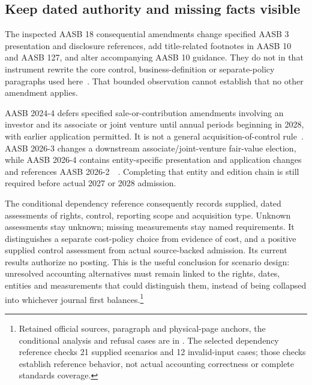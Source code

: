 \subsection{Keep dated authority and missing facts visible}

The inspected AASB 18 consequential amendments change specified AASB 3 presentation and disclosure references, add title-related footnotes in AASB 10 and AASB 127, and alter accompanying AASB 10 guidance. They do not in that instrument rewrite the core control, business-definition or separate-policy paragraphs used here~\citep[Appendix D, pp.~57, 70, 101--102]{aasb18scope2024}. That bounded observation cannot establish that no other amendment applies.

AASB 2024-4 defers specified sale-or-contribution amendments involving an investor and its associate or joint venture until annual periods beginning in 2028, with earlier application permitted. It is not a general acquisition-of-control rule~\citep[paras.~6--11]{aasb2024controltiming}. AASB 2026-3 changes a downstream associate/joint-venture fair-value election, while AASB 2026-4 contains entity-specific presentation and application changes and references AASB 2026-2~\citep[p.~5]{aasb2026associate}~\citep[paras.~1--3]{aasb2026presentation}. Completing that entity and edition chain is still required before actual 2027 or 2028 admission.

The conditional dependency reference consequently records supplied, dated assessments of rights, control, reporting scope and acquisition type. Unknown assessments stay unknown; missing measurements stay named requirements. It distinguishes a separate cost-policy choice from evidence of cost, and a positive supplied control assessment from actual source-backed admission. Its current results authorize no posting. This is the useful conclusion for scenario design: unresolved accounting alternatives must remain linked to the rights, dates, entities and measurements that could distinguish them, instead of being collapsed into whichever journal first balances.\footnote{Retained official sources, paragraph and physical-page anchors, the conditional analysis and refusal cases are in . The selected dependency reference checks 21 supplied scenarios and 12 invalid-input cases; those checks establish reference behavior, not actual accounting correctness or complete standards coverage.}
